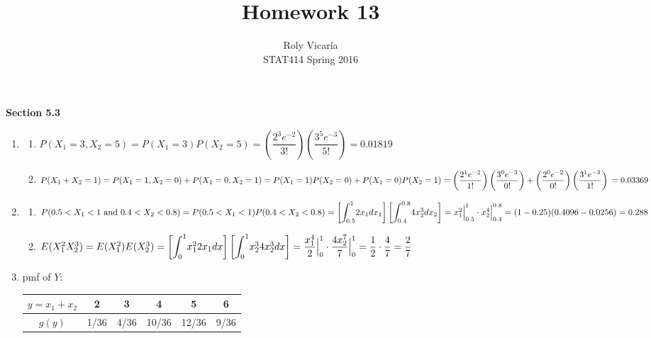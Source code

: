 \documentclass{article}
\title{Homework 13}
\author{Roly Vicar\'ia \\ STAT414 Spring 2016}
\newcommand\mfrac[2]{\left(\dfrac{#1}{#2}\right)}
\newcommand\lint{\mathlarger{\int}}
\newcommand\myskip[1]{\addtocounter{enumi}{#1}}
\begin{document}
    
    \maketitle
    
    \textbf{Section 5.3}
    \begin{enumerate}
     \item
      \begin{enumerate}
       \item
	$P(X_1 = 3, X_2 = 5) = P(X_1 = 3)P(X_2 = 5) = \mfrac{2^3e^{-2}}{3!}\mfrac{3^5e^{-3}}{5!}
	  = 0.01819$
       
       \item
	$P(X_1 + X_2 = 1) = P(X_1=1, X_2=0) + P(X_1=0, X_2=1) = \\
	  P(X_1=1)P(X_2=0) + P(X_1=0)P(X_2=1) = \mfrac{2^1e^{-2}}{1!}\mfrac{3^0e^{-3}}{0!} 
	  + \mfrac{2^0e^{-2}}{0!}\mfrac{3^1e^{-3}}{1!} \\
	  = 0.03369$
      \end{enumerate}
     \myskip{1}
     
     \item
      \begin{enumerate}
       \item
	$P(0.5 < X_1 < 1 \text{ and } 0.4 < X_2 < 0.8) = P(0.5 < X_1 < 1)P(0.4 < X_2 < 0.8) \\
	= \left[\lint_{0.5}^1 { 2x_1 dx_1 }\right]\left[\lint_{0.4}^{0.8} {4x_2^3 dx_2}\right] 
	= x_1^2 \Big|_{0.5}^1 \cdot x_2^4 \Big|_{0.4}^{0.8} = (1 - 0.25)(0.4096 - 0.0256)
	= 0.288$ 
	
       \item
	$E(X_1^2X_2^3) = E(X_1^2)E(X_2^3) = \left[\lint_0^1 {x_1^2 2x_1 dx}\right]
	\left[\lint_0^1 {x_2^3 4x_2^3 dx}\right] = \dfrac{x_1^4}{2} \Big|_0^1 \cdot 
	\dfrac{4x_2^7}{7} \Big|_0^1 = \dfrac{1}{2}\cdot \dfrac{4}{7} = \dfrac{2}{7}$
      \end{enumerate}
     \myskip{1}
     
     \item
      pmf of $Y$:
      \begin{center}
	\begin{tabular}{c | c | c | c | c | c}
	  $y = x_1 + x_2$ & 2 & 3 & 4 & 5 & 6 \\
	  \hline	    
	  $g(y)$ & 1/36 & 4/36 & 10/36 & 12/36 & 9/36 \\ 
	\end{tabular}
      \end{center}
      

\end{enumerate}
\end{document}
